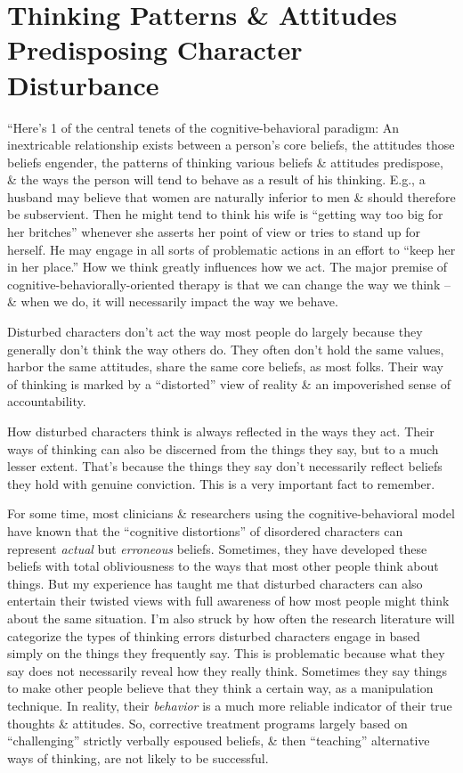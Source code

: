 \documentclass{article}
\numberwithin{equation}{section}
\begin{document}
\section{Thinking Patterns \& Attitudes Predisposing Character Disturbance}
``Here's 1 of the central tenets of the cognitive-behavioral paradigm: An inextricable relationship exists between a person's core beliefs, the attitudes those beliefs engender, the patterns of thinking various beliefs \& attitudes predispose, \& the ways the person will tend to behave as a result of his thinking. E.g., a husband may believe that women are naturally inferior to men \& should therefore be subservient. Then he might tend to think his wife is ``getting way too big for her britches'' whenever she asserts her point of view or tries to stand up for herself. He may engage in all sorts of problematic actions in an effort to ``keep her in her place.'' How we think greatly influences how we act. The major premise of cognitive-behaviorally-oriented therapy is that we can change the way we think -- \& when we do, it will necessarily impact the way we behave.

Disturbed characters don't act the way most people do largely because they generally don't think the way others do. They often don't hold the same values, harbor the same attitudes, share the same core beliefs, as most folks. Their way of thinking is marked by a ``distorted'' view of reality \& an impoverished sense of accountability.

How disturbed characters think is always reflected in the ways they act. Their ways of thinking can also be discerned from the things they say, but to a much lesser extent. That's because the things they say don't necessarily reflect beliefs they hold with genuine conviction. This is a very important fact to remember.

For some time, most clinicians \& researchers using the cognitive-behavioral model have known that the ``cognitive distortions'' of disordered characters can represent \textit{actual} but \textit{erroneous} beliefs. Sometimes, they have developed these beliefs with total obliviousness to the ways that most other people think about things. But my experience has taught me that disturbed characters can also entertain their twisted views with full awareness of how most people might think about the same situation. I'm also struck by how often the research literature will categorize the types of thinking errors disturbed characters engage in based simply on the things they frequently say. This is problematic because what they say does not necessarily reveal how they really think. Sometimes they say things to make other people believe that they think a certain way, as a manipulation technique. In reality, their \textit{behavior} is a much more reliable indicator of their true thoughts \& attitudes. So, corrective treatment programs largely based on ``challenging'' strictly verbally espoused beliefs, \& then ``teaching'' alternative ways of thinking, are not likely to be successful.
\end{document}

